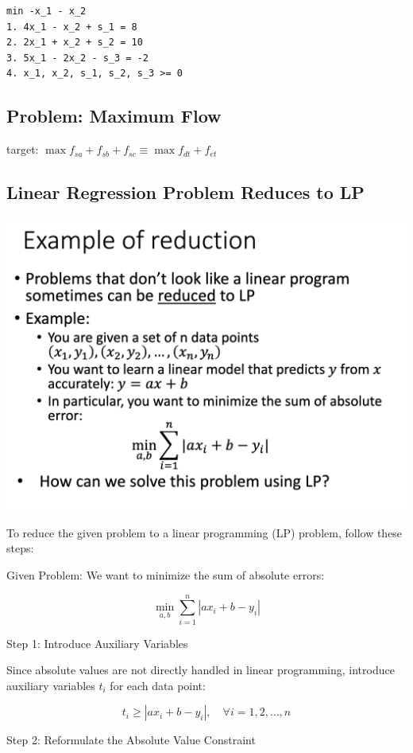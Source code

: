 \documentclass[12pt,a4paper]{article}
\begin{document}
\begin{verbatim}
min -x_1 - x_2
1. 4x_1 - x_2 + s_1 = 8
2. 2x_1 + x_2 + s_2 = 10
3. 5x_1 - 2x_2 - s_3 = -2
4. x_1, x_2, s_1, s_2, s_3 >= 0
\end{verbatim}

\subsection*{Problem: Maximum Flow}

target: \(\max{f_{sa} + f_{sb} +f_{sc}} \equiv \max{f_{dt} + f_{et}}\)

\subsection*{Linear Regression Problem Reduces to LP}

\includegraphics[width=\textwidth]{./images/lr_to_lp.png}

To reduce the given problem to a linear programming (LP) problem, follow these steps:

Given Problem:
We want to minimize the sum of absolute errors:

\[
\min_{a, b} \sum_{i=1}^{n} |a x_i + b - y_i|
\]

Step 1: Introduce Auxiliary Variables

Since absolute values are not directly handled in linear programming, introduce auxiliary variables \( t_i \) for each data point:

\[
t_i \geq |a x_i + b - y_i|, \quad \forall i = 1, 2, \dots, n
\]

Step 2: Reformulate the Absolute Value Constraint
\end{document}
